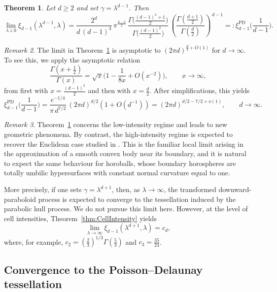 \documentclass[11pt,a4paper]{article}
\theoremstyle{plain}
\newtheorem{theorem}{Theorem}
\theoremstyle{definition}
\theoremstyle{remark}
\newtheorem{remark}[theorem]{Remark}
\begin{document}
\begin{theorem}\label{thm:AsymptoticsGeneralD}
	Let $d\geq 2$ and set $\gamma=\lambda^{d-1}$. Then
	\[
		\lim_{\lambda\downarrow0}\xi_{d-1}(\lambda^{d-1},\lambda)
		=
		\frac{2^{d}}{d\,(d-1)^3}\,
		\pi^{\frac{d-2}{2}}\,
		\frac{\Gamma\!\big(\frac{(d-1)^2+1}{2}\big)}{\Gamma\!\big(\frac{(d-1)^2}{2}\big)}\,
		\left(\frac{\Gamma(\frac{d+1}{2})}{\Gamma(\frac d2)}\right)^{\,d-1}=:\xi_{d-1}^{\operatorname{PD}}\Big(\frac{1}{d-1}\Big).
	\]
\end{theorem}

\begin{remark}
	The limit in Theorem~\ref{thm:AsymptoticsGeneralD} is asymptotic to $(2\pi d)^{\frac{d}{2}+O(1)}$ for $d\to \infty$. To see this, we apply the asymptotic relation
	$$
		\frac{\Gamma(x+\frac{1}{2})}{\Gamma(x)} = \sqrt{x}\Big(1-\frac{1}{8x}+O(x^{-2})\Big),\qquad x\to\infty,
	$$
	from \cite[Equation (5.11.13)]{NIST} first with $x=\frac{(d-1)^2}{2}$ and then with $x=\frac{d}{2}$. After simplifications, this yields
	$$
		\xi_{d-1}^{\operatorname{PD}}\Big(\frac{1}{d-1}\Big) = \frac{e^{-1/4}}{\pi\,d^{7/2}}\,(2\pi d)^{d/2}(1+O(d^{-1})) = (2\pi d)^{d/2-7/2+o(1)},\qquad d\to\infty.
	$$
\end{remark}

\begin{remark}
	Theorem~\ref{thm:AsymptoticsGeneralD} concerns the low-intensity regime and
	leads to new geometric phenomena. By contrast, the high-intensity regime is
	expected to recover the Euclidean case studied in
	\cite{CSY13,SY08}. This is the familiar local limit arising in the
	approximation of a smooth convex body near its boundary, and it is natural
	to expect the same behaviour for horoballs, whose boundary horospheres are
	totally umbilic hypersurfaces with constant normal curvature equal to one.

	More precisely, if one sets \(\gamma=\lambda^{d+1}\), then, as
	\(\lambda\to\infty\), the transformed downward-paraboloid process is expected
	to converge to the tessellation induced by the parabolic hull process. We do
	not pursue this limit here. However, at the level of cell intensities,
	Theorem~\ref{thm:CellIntensity} yields
	\[
		\lim_{\lambda\to\infty}
		\xi_{d-1}(\lambda^{d+1},\lambda)
		=
		c_d,
	\]
	where, for example, $c_2=(\frac{2}{3})^{1/3}\Gamma(\frac53)$ and $c_3=\frac{35}{24}$.
\end{remark}


\subsection{Convergence to the Poisson--Delaunay tessellation}
\end{document}

